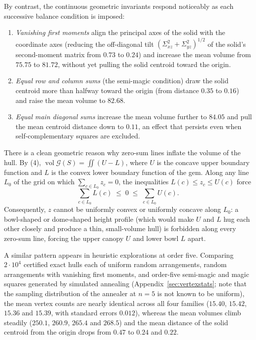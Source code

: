 By contrast, the continuous geometric invariants respond noticeably as each successive balance condition is imposed:
\begin{enumerate}\setlength\itemsep{1pt}
\item \emph{Vanishing first moments} align the principal axes of the solid with the coordinate axes (reducing the off-diagonal tilt $(\Sigma_{xz}^2+\Sigma_{yz}^2)^{1/2}$ of the solid's second-moment matrix from $0.73$ to $0.24$) and increase the mean volume from $75.75$ to $81.72$, without yet pulling the solid centroid toward the origin.
\item \emph{Equal row and column sums} (the semi-magic condition) draw the solid centroid more than halfway toward the origin (from distance $0.35$ to $0.16$) and raise the mean volume to $82.68$.
\item \emph{Equal main diagonal sums} increase the mean volume further to $84.05$ and pull the mean centroid distance down to $0.11$, an effect that persists even when self-complementary squares are excluded.
\end{enumerate}
There is a clean geometric reason why zero-sum lines inflate the volume of the hull. By (4), $\operatorname{vol}\mathcal G(S)=\iint(U-L)$, where $U$ is the concave upper boundary function and $L$ is the convex lower boundary function of the gem. Along any line $L_0$ of the grid on which $\sum_{c\in L_0}z_c=0$, the inequalities $L(c)\le z_c\le U(c)$ force
\[
\sum_{c\in L_0}L(c)\;\le\;0\;\le\;\sum_{c\in L_0}U(c).
\]
Consequently, $z$ cannot be uniformly convex or uniformly concave along $L_0$: a bowl-shaped or dome-shaped height profile (which would make $U$ and $L$ hug each other closely and produce a thin, small-volume hull) is forbidden along every zero-sum line, forcing the upper canopy $U$ and lower bowl $L$ apart.

A similar pattern appears in heuristic explorations at order five. Comparing $2\cdot10^4$ certified exact hulls each of uniform random arrangements, random arrangements with vanishing first moments, and order-five semi-magic and magic squares generated by simulated annealing (Appendix~\ref{sec:vertexstats}; note that the sampling distribution of the annealer at $n=5$ is not known to be uniform), the mean vertex counts are nearly identical across all four families ($15.40$, $15.42$, $15.36$ and $15.39$, with standard errors $0.012$), whereas the mean volumes climb steadily ($250.1$, $260.9$, $265.4$ and $268.5$) and the mean distance of the solid centroid from the origin drops from $0.47$ to $0.24$ and $0.22$.
